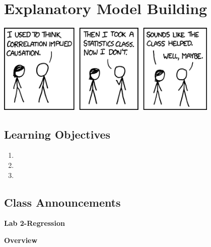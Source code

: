 \documentclass[
]{book}
\providecommand{\tightlist}{%
  \setlength{\itemsep}{0pt}\setlength{\parskip}{0pt}}
\theoremstyle{definition}
\theoremstyle{definition}
\theoremstyle{definition}
\theoremstyle{definition}
\theoremstyle{remark}
\begin{document}
\hypertarget{explanatory-model-building}{%
\chapter{Explanatory Model Building}\label{explanatory-model-building}}

\includegraphics[width=0.8\textwidth,height=\textheight]{./images/correlation.png}

\hypertarget{learning-objectives-10}{%
\section{Learning Objectives}\label{learning-objectives-10}}

\begin{enumerate}
\def\labelenumi{\arabic{enumi}.}
\tightlist
\item
\item
\item
\end{enumerate}

\hypertarget{class-announcements-9}{%
\section{Class Announcements}\label{class-announcements-9}}

\textbf{Lab 2-Regression}

\textbf{Overview}
\end{document}
